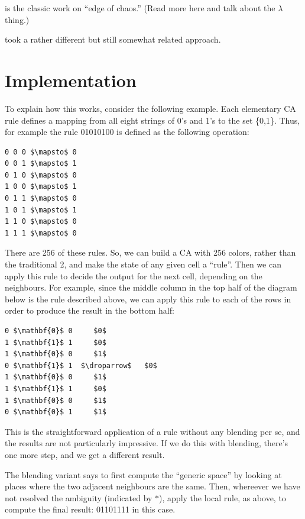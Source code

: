 \documentclass{AISB2008}
\newcommand{\droparrow}{%
  \mathchoice{\raisebox{-4pt}{$\displaystyle\mapsto$}}
             {\raisebox{-4pt}{$\mapsto$}}
             {\raisebox{-2pt}{$\scriptstyle\mapsto$}}
             {\raisebox{-2pt}{$\scriptscriptstyle\mapsto$}}}
\begin{document}
\cite{mitchell1993revisiting} is the classic work on ``edge of
chaos.'' (Read more here and talk about the $\lambda$ thing.)

\cite{hofstadter1995prolegomena,marshall1999metacat} took a rather
different but still somewhat related approach.

\clearpage

\section{Implementation}

To explain how this works, consider the following example.  Each elementary CA rule defines a mapping from all eight strings of 0's and 1's to the set \{0,1\}.  Thus, for example the rule 01010100 is defined as the following operation:
\begin{lstlisting}[mathescape]
0 0 0 $\mapsto$ 0
0 0 1 $\mapsto$ 1
0 1 0 $\mapsto$ 0
1 0 0 $\mapsto$ 1
0 1 1 $\mapsto$ 0
1 0 1 $\mapsto$ 1
1 1 0 $\mapsto$ 0
1 1 1 $\mapsto$ 0
\end{lstlisting}

There are 256 of these rules. So, we can build a CA with 256 colors, rather than the traditional 2, and make the state of any given cell a ``rule''. Then we can apply this rule to decide the output for the next cell, depending on the neighbours. For example, since the middle column in the top half of the diagram below is the rule described above, we can apply this rule to each of the rows in order to produce the result in the bottom half:
\begin{lstlisting}[mathescape]
0 $\mathbf{0}$ 0     $0$ 
1 $\mathbf{1}$ 1     $0$ 
1 $\mathbf{0}$ 0     $1$
0 $\mathbf{1}$ 1  $\droparrow$   $0$
1 $\mathbf{0}$ 0     $1$ 
1 $\mathbf{1}$ 1     $0$ 
1 $\mathbf{0}$ 0     $1$ 
0 $\mathbf{0}$ 1     $1$ 
\end{lstlisting}

This is the straightforward application of a rule without any blending per se, and the results are not particularly impressive.  If we do this with blending, there’s one more step, and we get a different result.

The blending variant says to first compute the ``generic space'' by looking at places where the two adjacent neighbours are the same. Then, whereever we have not resolved the ambiguity (indicated by $\ast$), apply the local rule, as above, to compute the final result: 01101111 in this case.

\lstset{
  xleftmargin=.3\columnwidth, xrightmargin=.3\columnwidth
}
\end{document}
